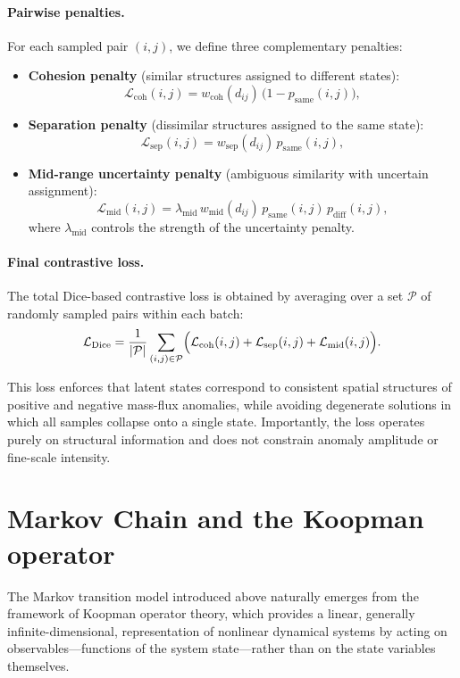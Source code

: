 \documentclass[11pt]{article}
\begin{document}
\paragraph{Pairwise penalties.}
For each sampled pair $(i,j)$, we define three complementary penalties:
\begin{itemize}
\item \textbf{Cohesion penalty} (similar structures assigned to different states):
\[
\mathcal{L}_{\mathrm{coh}}(i,j)
=
w_{\mathrm{coh}}(d_{ij}) \, \bigl(1 - p_{\mathrm{same}}(i,j)\bigr),
\]
\item \textbf{Separation penalty} (dissimilar structures assigned to the same state):
\[
\mathcal{L}_{\mathrm{sep}}(i,j)
=
w_{\mathrm{sep}}(d_{ij}) \, p_{\mathrm{same}}(i,j),
\]
\item \textbf{Mid-range uncertainty penalty} (ambiguous similarity with uncertain assignment):
\[
\mathcal{L}_{\mathrm{mid}}(i,j)
=
\lambda_{\mathrm{mid}}\,
w_{\mathrm{mid}}(d_{ij})\,
p_{\mathrm{same}}(i,j)\, p_{\mathrm{diff}}(i,j),
\]
where $\lambda_{\mathrm{mid}}$ controls the strength of the uncertainty penalty.
\end{itemize}

\paragraph{Final contrastive loss.}
The total Dice-based contrastive loss is obtained by averaging over a set $\mathcal{P}$ of randomly sampled pairs within each batch:
\[
\mathcal{L}_{\mathrm{Dice}}
=
\frac{1}{|\mathcal{P}|}
\sum_{(i,j)\in\mathcal{P}}
\Bigl(
\mathcal{L}_{\mathrm{coh}}(i,j)
+
\mathcal{L}_{\mathrm{sep}}(i,j)
+
\mathcal{L}_{\mathrm{mid}}(i,j)
\Bigr).
\]

This loss enforces that latent states correspond to consistent spatial structures of positive and negative mass-flux anomalies, while avoiding degenerate solutions in which all samples collapse onto a single state. Importantly, the loss operates purely on structural information and does not constrain anomaly amplitude or fine-scale intensity.


\section{Markov Chain and the Koopman operator}

The Markov transition model introduced above naturally emerges from the framework of Koopman operator theory, which provides a linear, generally infinite-dimensional, representation of nonlinear dynamical systems by acting on observables---functions of the system state---rather than on the state variables themselves.
\end{document}
